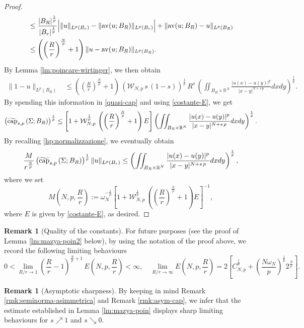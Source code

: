 \documentclass{amsart}
\theoremstyle{definition}
\newtheorem{remark}[theorem]{Remark}
\numberwithin{equation}{section}
\begin{document}
\begin{proof}
\[\begin{split}
		&\le \frac{|B_{R}|^{\frac{1}{p}}}{|B_r|^{\frac{1}{p}}}\Big|\|u\|_{L^p(B_r)} - \|{\rm av}(u; B_{R})\|_{L^p(B_r)}\Big| + \|{\rm av}(u; B_{R}) - u\|_{L^p(B_{R})} \\
		&\le \left(\left(\frac{R}{r}\right)^{\frac{N}{p}} + 1 \right)\|u - {\rm av}(u; B_{R})\|_{L^p(B_{R})}.
	\end{split} 
	\]
	By Lemma \ref{lm:poincare-wirtinger}, we then obtain
	\[
	\begin{split}
		\|1 - u\|_{L^p(B_{R})} &\le  \left(\left(\frac{R}{r}\right)^{\frac{N}{p}} + 1 \right)\,\left(\mathcal{W}_{N,p}\,s\,(1-s)\right)^{\frac{1}{p}}\,R^{s}\,\left(\iint_{B_{R} \times \mathbb{R}^N} \frac{|u(x) - u(y)|^p}{|x-y|^{N+s\,p}}dxdy\right)^{\frac{1}{p}}.
	\end{split}
	\]
	By spending this information in \eqref{quasi-cap} and using \eqref{costante-E}, we get 
	\[
	\left(\widetilde{\rm cap}_{s,p}\left(\Sigma; B_{R}\right)\right)^{\frac{1}{p}}  \le \left[1 + \mathcal{W}_{N,p}^{\frac{1}{p}}\,\left(\left(\frac{R}{r}\right)^{\frac{N}{p}} + 1 \right)E \right]\left(\iint_{B_{R} \times \mathbb{R}^N} \frac{|u(x) - u(y)|^p}{|x-y|^{N+s\,p}}dxdy\right)^{\frac{1}{p}}.
	\]
	By recalling \eqref{hp:normalizzazione}, we eventually obtain 
	\[
	\frac{M}{r^{\frac{N}{p}}} \left(\widetilde{\rm cap}_{s,p}\left(\Sigma; B_{R}\right)\right)^{\frac{1}{p}}  \|u\|_{L^p(B_r)} \le \left(\iint_{B_{R} \times \mathbb{R}^N} \frac{|u(x) - u(y)|^p}{|x-y|^{N+s\,p}}dxdy\right)^{\frac{1}{p}},
	\]
	where we set 
	\[
	M\left(N,p, \frac{R}{r}\right):= \omega_N^{-\frac{1}{p}} \left[1 + \mathcal{W}_{N,p}^{\frac{1}{p}}\,\left(\left(\frac{R}{r}\right)^{\frac{N}{p}} + 1 \right)E \right]^{-1},
	\]
	where $E$ is given by \eqref{costante-E}, as desired. 
\end{proof}
\begin{remark}[Quality of the constants] \label{rmk:asym-maz-poin}
	For future purposes (see the proof of Lemma \ref{lm:mazya-poin2} below), by using the notation of the proof above, we record the following limiting behaviours  
	\[
	0 < \lim_{R/r \to 1} \left(\frac{R}{r} - 1\right)^{\frac{N}{p} + 1}\,E\left(N,p, \frac{R}{r}\right) < \infty, \quad \lim_{R/r \to \infty}E\left(N,p, \frac{R}{r}\right)= 2\left[C_{N,p}^{\frac{1}{p}} + \left(\frac{N \omega_N}{p}\right)^{\frac{1}{p}} 2^{\frac{N}{p}}\right].
	\]
\end{remark}

\begin{remark}[Asymptotic sharpness] \label{rmk:asym-sharp1}
	 By keeping in mind Remark \ref{rmk:seminorma-asimmetrica} and Remark \ref{rmk:asym-cap}, we infer that the estimate established in Lemma \ref{lm:mazya-poin} displays sharp limiting behaviours for $s \nearrow 1$ and $s \searrow 0$. 
\end{remark}
\end{document}
